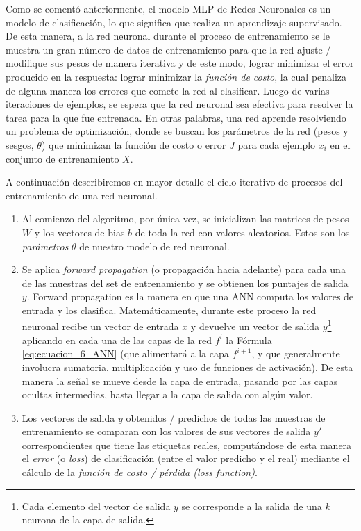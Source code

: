 \documentclass[12pt,a4paper]{article}
\begin{document}
\begin{sloppypar}
Como se comentó anteriormente, el modelo MLP de Redes Neuronales es un modelo de clasificación, lo que significa que realiza un aprendizaje supervisado. De esta manera, a la red neuronal durante el proceso de entrenamiento se le muestra un gran número de datos de entrenamiento para que la red ajuste / modifique sus pesos de manera iterativa y de este modo, lograr minimizar el error producido en la respuesta: lograr minimizar la \textit{función de costo}, la cual penaliza de alguna manera los errores que comete la red al clasificar. Luego de varias iteraciones de ejemplos, se espera que la red neuronal sea efectiva para resolver la tarea para la que fue entrenada.
En otras palabras, una red aprende resolviendo un problema de optimización, donde se buscan los parámetros de la red (pesos y sesgos, $\theta$) que minimizan la función de costo o error $J$ para cada ejemplo $x_i$ en el conjunto de entrenamiento $X$. 

A continuación describiremos en mayor detalle el ciclo iterativo de procesos del entrenamiento de una red neuronal\cite{ANN_25}.

\begin{enumerate}
\item Al comienzo del algoritmo, por única vez, se inicializan las matrices de pesos $W$ y los vectores de bias $b$ de toda la red con valores aleatorios. Estos son los \textit{parámetros} $\theta$ de nuestro modelo de red neuronal.
  
\item Se aplica \textit{forward propagation} (o propagación hacia adelante) para cada una de las muestras del set de entrenamiento y se obtienen los puntajes de salida $y$. Forward propagation es la manera en que una ANN computa los valores de entrada y los clasifica. Matemáticamente, durante este proceso la red neuronal recibe un vector de entrada $x$ y devuelve un vector de salida $y$\footnote{Cada elemento del vector de salida $y$ se corresponde a la salida de una $k$ neurona de la capa de salida.} aplicando en cada una de las capas de la red $f^{i}$ la Fórmula \ref{eq:ecuacion_6_ANN} (que alimentará a la capa $f^{i+1}$, y que generalmente involucra sumatoria, multiplicación y uso de funciones de activación). De esta manera la señal se mueve desde la capa de entrada, pasando por las capas ocultas intermedias, hasta llegar a la capa de salida con algún valor.

\item Los vectores de salida $y$ obtenidos / predichos de todas las muestras de entrenamiento se comparan con los valores de sus vectores de salida $y'$ correspondientes que tiene las etiquetas reales, computándose de esta manera el \textit{error} (o \textit{loss}) de clasificación (entre el valor predicho y el real) mediante el cálculo de la \textit{función de costo / pérdida (loss function)}.


\end{enumerate}
\end{sloppypar}
\end{document}
